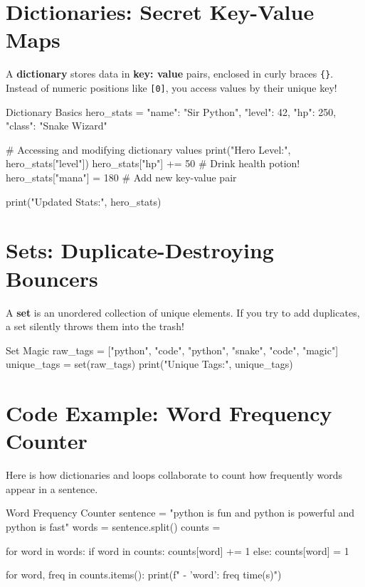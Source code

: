 \section{Dictionaries: Secret Key-Value Maps}

A \textbf{dictionary} stores data in \textbf{key: value} pairs, enclosed in curly braces \texttt{\{\}}. Instead of numeric positions like \texttt{[0]}, you access values by their unique key!

\begin{pycode}{Dictionary Basics}
hero_stats = {
    "name": "Sir Python",
    "level": 42,
    "hp": 250,
    "class": "Snake Wizard"
}

# Accessing and modifying dictionary values
print("Hero Level:", hero_stats["level"])
hero_stats["hp"] += 50   # Drink health potion!
hero_stats["mana"] = 180  # Add new key-value pair

print("Updated Stats:", hero_stats)
\end{pycode}

\section{Sets: Duplicate-Destroying Bouncers}

A \textbf{set} is an unordered collection of unique elements. If you try to add duplicates, a set silently throws them into the trash!

\begin{pycode}{Set Magic}
raw_tags = ["python", "code", "python", "snake", "code", "magic"]
unique_tags = set(raw_tags)
print("Unique Tags:", unique_tags)
\end{pycode}

\section{Code Example: Word Frequency Counter}

Here is how dictionaries and loops collaborate to count how frequently words appear in a sentence.

\begin{pycode}{Word Frequency Counter}
sentence = "python is fun and python is powerful and python is fast"
words = sentence.split()
counts = {}

for word in words:
    if word in counts:
        counts[word] += 1
    else:
        counts[word] = 1

for word, freq in counts.items():
    print(f" - '{word}': {freq} time(s)")
\end{pycode}

